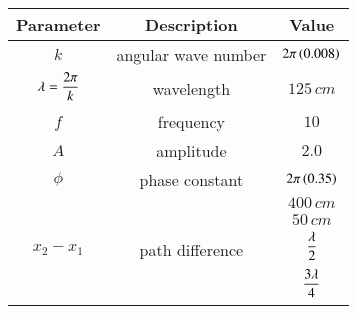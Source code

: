 \begin{tabular}{|c|c|c|}
\hline
\textbf{Parameter}&\textbf{Description} &\textbf{Value}\\
   \hline
   $k$ & angular wave number & $2\pi\left(0.008\right)$ \\
   \hline
   $\lambda=\dfrac{2\pi}{k\vphantom{\brak{0.1}}}$ & wavelength & $125\,cm$ \\
   \hline
   $f$ & frequency & $10$\\
   \hline
   $A$ & amplitude & $2.0$\\
   \hline
   $\phi$ & phase constant &  $2\pi\left(0.35\right)$ \\
   \hline
   \multirow{4}{*}{$x_2 - x_1$} & \multirow{4}{*}{path difference} & $400\, cm$\\
   \cline{3-3}
   & & $50\, cm$ \\
   \cline{3-3}
   & & $\dfrac{\lambda}{2\vphantom{\brak{0.1}}}$ \\
   \cline{3-3}
   & & $\dfrac{3\lambda}{4\vphantom{\brak{0.1}}}$ \\
   \hline
\end{tabular}
